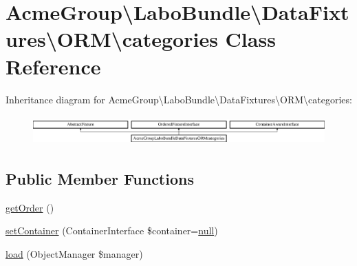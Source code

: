 \hypertarget{class_acme_group_1_1_labo_bundle_1_1_data_fixtures_1_1_o_r_m_1_1categories}{\section{Acme\+Group\textbackslash{}Labo\+Bundle\textbackslash{}Data\+Fixtures\textbackslash{}O\+R\+M\textbackslash{}categories Class Reference}
\label{class_acme_group_1_1_labo_bundle_1_1_data_fixtures_1_1_o_r_m_1_1categories}
}
Inheritance diagram for Acme\+Group\textbackslash{}Labo\+Bundle\textbackslash{}Data\+Fixtures\textbackslash{}O\+R\+M\textbackslash{}categories\+:\begin{figure}[H]
\begin{center}
\leavevmode
\includegraphics[height=1.134752cm]{class_acme_group_1_1_labo_bundle_1_1_data_fixtures_1_1_o_r_m_1_1categories}
\end{center}
\end{figure}
\subsection*{Public Member Functions}
\begin{DoxyCompactItemize}
\item 
\hyperlink{class_acme_group_1_1_labo_bundle_1_1_data_fixtures_1_1_o_r_m_1_1categories_acd09736ecc67d9479bc6419a58411c17}{get\+Order} ()
\item 
\hyperlink{class_acme_group_1_1_labo_bundle_1_1_data_fixtures_1_1_o_r_m_1_1categories_a2bed71a10438aa9ed83d6b6af8ea1011}{set\+Container} (Container\+Interface \$container=\hyperlink{validate_8js_afb8e110345c45e74478894341ab6b28e}{null})
\item 
\hyperlink{class_acme_group_1_1_labo_bundle_1_1_data_fixtures_1_1_o_r_m_1_1categories_a474bef4e193819cd154d898e5949b6b7}{load} (Object\+Manager \$manager)
\end{DoxyCompactItemize}


